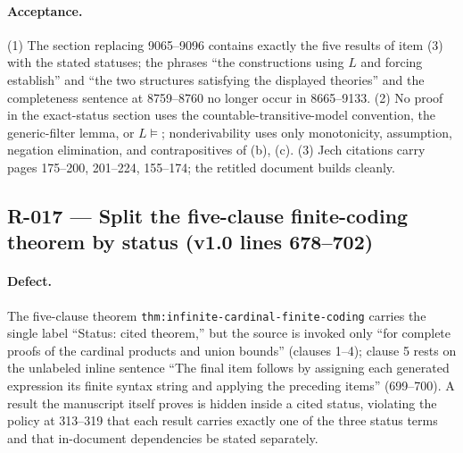 \paragraph{Acceptance.}
(1) The section replacing 9065--9096 contains exactly the five results of item (3) with the stated statuses; the phrases ``the constructions using \(L\) and forcing establish'' and ``the two structures satisfying the displayed theories'' and the completeness sentence at 8759--8760 no longer occur in 8665--9133.
(2) No proof in the exact-status section uses the countable-transitive-model convention, the generic-filter lemma, or \(L\models\); nonderivability uses only monotonicity, assumption, negation elimination, and contrapositives of (b), (c).
(3) Jech citations carry pages 175--200, 201--224, 155--174; the retitled document builds cleanly.

\subsection*{R-017 --- Split the five-clause finite-coding theorem by status (v1.0 lines 678--702)}

\paragraph{Defect.}
The five-clause theorem \texttt{thm:infinite-cardinal-finite-coding} carries the single label ``Status: cited theorem,'' but the source is invoked only ``for complete proofs of the cardinal products and union bounds'' (clauses 1--4); clause 5 rests on the unlabeled inline sentence ``The final item follows by assigning each generated expression its finite syntax string and applying the preceding items'' (699--700).  A result the manuscript itself proves is hidden inside a cited status, violating the policy at 313--319 that each result carries exactly one of the three status terms and that in-document dependencies be stated separately.

